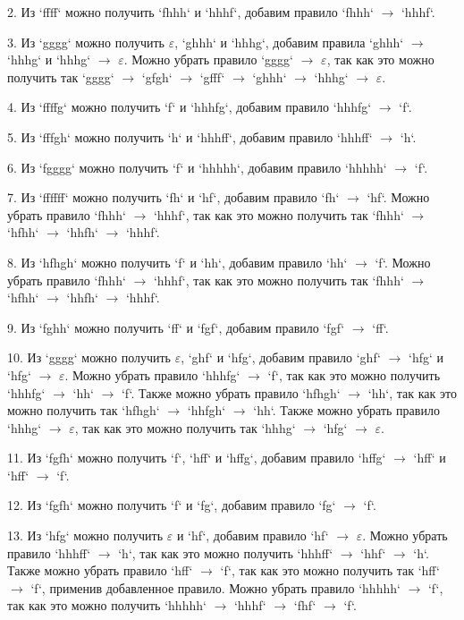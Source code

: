 \documentclass[a4paper, 14pt]{extarticle}
\begin{document}
2. Из `ffff` можно получить `fhhh` и `hhhf`, добавим правило `fhhh` $\rightarrow$ `hhhf`.

3. Из `gggg` можно получить $\varepsilon$, `ghhh` и `hhhg`, добавим правила `ghhh` $\rightarrow$ `hhhg` и `hhhg` $\rightarrow$ $\varepsilon$. Можно убрать правило `gggg` $\rightarrow$ $\varepsilon$, так как это можно получить так `gggg` $\rightarrow$ `gfgh` $\rightarrow$ `gfff` $\rightarrow$ `ghhh` $\rightarrow$ `hhhg` $\rightarrow$ $\varepsilon$.

4. Из `ffffg` можно получить `f` и `hhhfg`, добавим правило `hhhfg` $\rightarrow$ `f`.

5. Из `fffgh` можно получить `h` и `hhhff`, добавим правило `hhhff` $\rightarrow$ `h`.

6. Из `fgggg` можно получить `f` и `hhhhh`, добавим правило `hhhhh` $\rightarrow$ `f`.

7. Из `ffffff` можно получить `fh` и `hf`, добавим правило `fh` $\rightarrow$ `hf`. Можно убрать правило `fhhh` $\rightarrow$ `hhhf`, так как это можно получить так `fhhh` $\rightarrow$ `hfhh` $\rightarrow$ `hhfh` $\rightarrow$ `hhhf`.

8. Из `hfhgh` можно получить `f` и `hh`, добавим правило `hh` $\rightarrow$ `f`. Можно убрать правило `fhhh` $\rightarrow$ `hhhf`, так как это можно получить так `fhhh` $\rightarrow$ `hfhh` $\rightarrow$ `hhfh` $\rightarrow$ `hhhf`. 

9. Из `fghh` можно получить `ff` и `fgf`, добавим правило `fgf` $\rightarrow$ `ff`. 

10. Из `gggg` можно получить $\varepsilon$, `ghf` и `hfg`, добавим правило `ghf` $\rightarrow$ `hfg` и `hfg` $\rightarrow$ $\varepsilon$. Можно убрать правило `hhhfg` $\rightarrow$ `f`, так как это можно получить `hhhfg` $\rightarrow$ `hh` $\rightarrow$ `f`. Также можно убрать правило `hfhgh` $\rightarrow$ `hh`, так как это можно получить так `hfhgh` $\rightarrow$ `hhfgh` $\rightarrow$ `hh`. Также можно убрать правило `hhhg` $\rightarrow$ $\varepsilon$, так как это можно получить так `hhhg` $\rightarrow$ `hfg` $\rightarrow$ $\varepsilon$.

11. Из `fgfh` можно получить `f`, `hff` и `hffg`, добавим правило `hffg` $\rightarrow$ `hff` и `hff` $\rightarrow$ `f`. 

12. Из `fgfh` можно получить `f` и `fg`, добавим правило `fg` $\rightarrow$ `f`. 

13. Из `hfg` можно получить $\varepsilon$ и `hf`, добавим правило `hf` $\rightarrow$ $\varepsilon$. Можно убрать правило `hhhff` $\rightarrow$ `h`, так как это можно получить `hhhff` $\rightarrow$ `hhf` $\rightarrow$ `h`. Также можно убрать правило `hff` $\rightarrow$ `f`, так как это можно получить так `hff` $\rightarrow$ `f`, применив добавленное правило. Можно убрать правило `hhhhh` $\rightarrow$ `f`, так как это можно получить `hhhhh` $\rightarrow$ `hhhf` $\rightarrow$ `fhf` $\rightarrow$ `f`.
\end{document}
